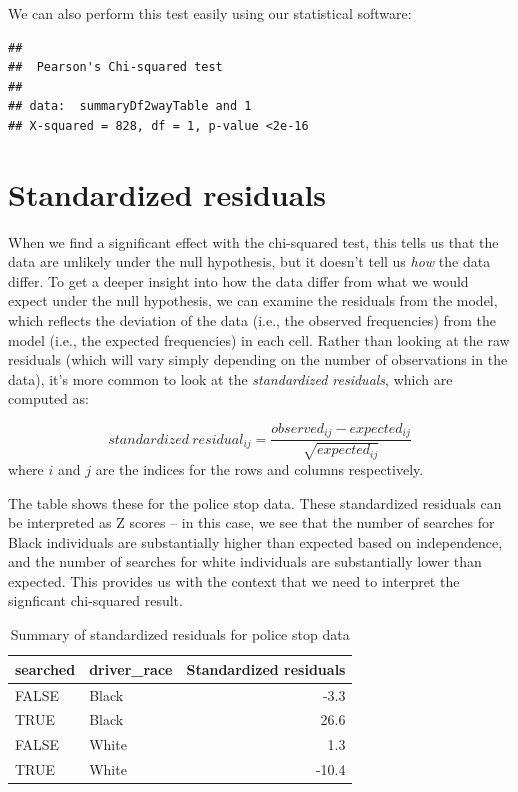 \documentclass[12pt,]{book}
\theoremstyle{definition}
\theoremstyle{definition}
\theoremstyle{definition}
\theoremstyle{remark}
\begin{document}
We can also perform this test easily using our statistical software:

\begin{verbatim}
## 
##  Pearson's Chi-squared test
## 
## data:  summaryDf2wayTable and 1
## X-squared = 828, df = 1, p-value <2e-16
\end{verbatim}

\hypertarget{standardized-residuals}{%
\section{Standardized residuals}\label{standardized-residuals}}

When we find a significant effect with the chi-squared test, this tells us that the data are unlikely under the null hypothesis, but it doesn't tell us \emph{how} the data differ. To get a deeper insight into how the data differ from what we would expect under the null hypothesis, we can examine the residuals from the model, which reflects the deviation of the data (i.e., the observed frequencies) from the model (i.e., the expected frequencies) in each cell. Rather than looking at the raw residuals (which will vary simply depending on the number of observations in the data), it's more common to look at the \emph{standardized residuals}, which are computed as:

\[
standardized\ residual_{ij} = \frac{observed_{ij} - expected_{ij}}{\sqrt{expected_{ij}}}
\]
where \(i\) and \(j\) are the indices for the rows and columns respectively.

The table shows these for the police stop data. These standardized residuals can be interpreted as Z scores -- in this case, we see that the number of searches for Black individuals are substantially higher than expected based on independence, and the number of searches for white individuals are substantially lower than expected. This provides us with the context that we need to interpret the signficant chi-squared result.

\begin{table}

\caption{\label{tab:unnamed-chunk-85}Summary of standardized residuals for police stop data}
\centering
\begin{tabular}[t]{l|l|r}
\hline
searched & driver\_race & Standardized residuals\\
\hline
FALSE & Black & -3.3\\
\hline
TRUE & Black & 26.6\\
\hline
FALSE & White & 1.3\\
\hline
TRUE & White & -10.4\\
\hline
\end{tabular}
\end{table}
\end{document}
